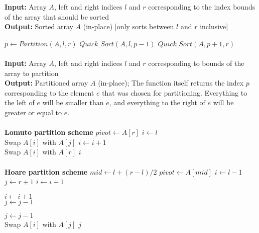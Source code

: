 \documentclass[12pt,a4paper]{article}
\begin{document}
	\begin{algorithm}
		\textbf{Input:} Array $ A $, left and right indices $ l $ and $ r $ corresponding to the
		index bounds of the array that should be sorted
		\\\textbf{Output:} Sorted array $ A $ (in-place) [only sorts between $ l $ and $ r $ inclusive]
		\begin{algorithmic}
					\State $ p \gets Partition(A, l, r) $
					\State $ Quick\_Sort(A, l, p - 1) $
					\State $ Quick\_Sort(A, p + 1, r) $
				\EndIf
			\EndProcedure
			\\\\
			\textbf{Input:} Array $ A $, left and right indices $ l $ and $ r $ corresponding to bounds of the array to partition
			\\\textbf{Output:} Partitioned array $ A $ (in-place); The function itself returns the index $ p $ corresponding to the element $ e $ that was chosen for partitioning. Everything to the left of $ e $ will be smaller than $ e $, and everything to the right of $ e $ will be greater or equal to $ e $.
			\\
			\\\textbf{Lomuto partition scheme}
				\State $ pivot \gets A[r] $
				\State $ i \gets l $
				\\
						\State Swap $ A[i] $ with $ A[j] $
						\State $ i \gets i + 1 $
					\EndIf
				\EndFor
				\\
				\State Swap $ A[i] $ with $ A[r] $
				\State \Return $ i $
			\EndProcedure
			\\
			\\\textbf{Hoare partition scheme}
				\State $ mid \gets l + (r - l)/2 $
				\State $ pivot \gets A[mid] $
				\State $ i \gets l - 1 $
				\State $ j \gets r + 1 $
					\State $ i \gets i + 1 $
					
						\State $ i \gets i + 1 $
					\EndWhile
					\\
					\State $ j \gets j - 1 $
					
						\State $ j \gets j - 1 $
					\EndWhile
					\\
						\State Swap $ A[i] $ with $ A[j] $
					\Else{}
						\State \Return $ j $
					\EndIf
				\EndWhile
			\EndProcedure
		\end{algorithmic}
	\end{algorithm}
\end{document}
